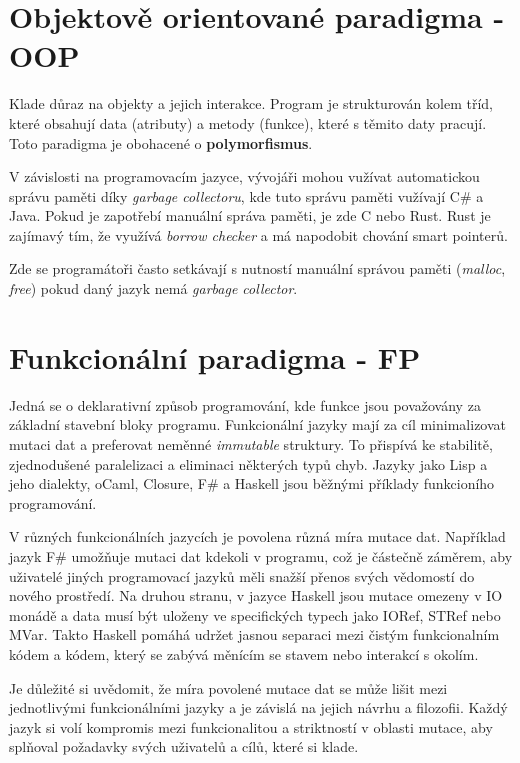 \documentclass[male,czech]{kithesis}
\begin{document}
\section{Objektově orientované paradigma - OOP}

Klade důraz na objekty a jejich interakce. 
Program je strukturován kolem tříd, 
které obsahují data (atributy) a 
metody (funkce), 
které s těmito daty pracují. 
Toto paradigma je obohacené o \textbf{polymorfismus}.

V závislosti na programovacím jazyce, 
vývojáři mohou vužívat automatickou správu paměti díky \textit{garbage collectoru}, 
kde tuto správu paměti vužívají C\# a Java. 
Pokud je zapotřebí manuální správa paměti, 
je zde C\+\+ nebo Rust. 
Rust je zajímavý tím, že využívá \textit{borrow checker} 
a má napodobit chování smart pointerů.

Zde se programátoři často setkávají s nutností
manuální správou paměti (\textit{malloc}, \textit{free}) pokud
daný jazyk nemá \textit{garbage collector}.

\section{Funkcionální paradigma - FP}
Jedná se o deklarativní způsob programování, kde funkce jsou 
považovány za základní stavební bloky programu. 
Funkcionální jazyky mají za cíl minimalizovat mutaci dat a preferovat neměnné \textit{immutable}
struktury. 
To přispívá ke stabilitě, zjednodušené paralelizaci a eliminaci některých typů chyb. 
Jazyky jako Lisp a jeho dialekty, oCaml, Closure, F\# a Haskell 
jsou běžnými příklady funkcioního programování.

V různých funkcionálních jazycích je povolena různá míra mutace dat.
Například jazyk F\# umožňuje mutaci dat kdekoli v programu, 
což je částečně záměrem, 
aby uživatelé jiných programovací jazyků měli snažší přenos svých vědomostí do 
nového prostředí.
Na druhou stranu, 
v jazyce Haskell jsou mutace omezeny v IO monádě a 
data musí být uloženy 
ve specifických typech jako IORef, STRef nebo MVar. 
Takto Haskell pomáhá udržet jasnou separaci mezi čistým funkcionalním kódem a kódem, 
který se zabývá měnícím se stavem nebo interakcí s okolím.

Je důležité si uvědomit, 
že míra povolené mutace dat se může lišit mezi jednotlivými funkcionálními jazyky a 
je závislá na jejich návrhu a filozofii. 
Každý jazyk si volí kompromis mezi funkcionalitou a 
striktností v oblasti mutace, 
aby splňoval požadavky svých uživatelů a cílů, 
které si klade.
\end{document}
